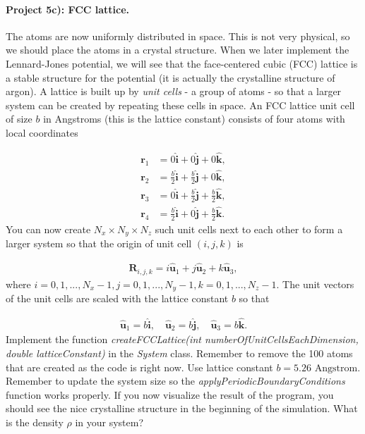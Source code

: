 \documentclass[%
oneside,                 %
final,                   %
10pt]{article}
\begin{document}
\paragraph{Project 5c): FCC lattice.}
The atoms are now uniformly distributed in space. This is not very physical, so we should place the atoms in a crystal structure. When we later implement the Lennard-Jones potential, we will see that the face-centered cubic (FCC) lattice is a stable structure for the potential (it is actually the crystalline structure of argon). A lattice is built up by \emph{unit cells} - a group of atoms - so that a larger system can be created by repeating these cells in space. An FCC lattice unit cell of size $b$ in Angstroms (this is the lattice constant) consists of four atoms with local coordinates

\begin{align}
	\mathbf{r}_1 &= 0 \hat{\mathbf{i}} + 0 \hat{\mathbf{j}} + 0 \hat{\mathbf{k}},\\
	\mathbf{r}_2 &= \frac{b}{2} \hat{\mathbf{i}} + \frac{b}{2} \hat{\mathbf{j}} + 0 \hat{\mathbf{k}},\\
	\mathbf{r}_3 &= 0 \hat{\mathbf{i}} + \frac{b}{2} \hat{\mathbf{j}} + \frac{b}{2} \hat{\mathbf{k}},\\
	\mathbf{r}_4 &= \frac{b}{2} \hat{\mathbf{i}} + 0 \hat{\mathbf{j}} + \frac{b}{2} \hat{\mathbf{k}}.
\end{align}
You can now create $N_x \times N_y \times N_z$ such unit cells next to each other to form a larger system so that the origin of unit cell $(i,j,k)$ is

\begin{align}
	\mathbf{R}_{i,j,k} = i \hat{\mathbf{u}}_1 + j \hat{\mathbf{u}}_2 + k \hat{\mathbf{u}}_3,
\end{align}
where $i=0,1,..., N_x-1, j=0,1,..., N_y-1, k=0,1,..., N_z-1$. The unit vectors of the unit cells are scaled with the lattice constant $b$ so that

\begin{align}
	\hat{\mathbf{u}}_1 = b\hat{\mathbf{i}}, \quad \hat{\mathbf{u}}_2 = b\hat{\mathbf{j}}, \quad \hat{\mathbf{u}}_3 = b\hat{\mathbf{k}}.
\end{align}
Implement the function \emph{createFCCLattice(int numberOfUnitCellsEachDimension, double latticeConstant)} in the \emph{System} class. Remember to remove the 100 atoms that are created as the code is right now. Use lattice constant $b=5.26$ $\mathrm{Angstrom}$. Remember to update the system size so the \emph{applyPeriodicBoundaryConditions} function works properly. If you now visualize the result of the program, you should see the nice crystalline structure in the beginning of the simulation. What is the density $\rho$ in your system?
\end{document}
